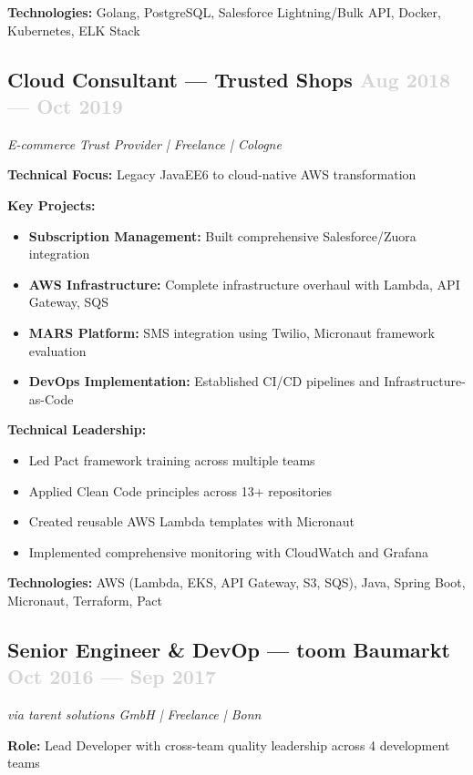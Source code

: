 \documentclass[11pt,a4paper]{article}
\begin{document}
\textbf{Technologies:} Golang, PostgreSQL, Salesforce Lightning/Bulk API, Docker, Kubernetes, ELK Stack

\newpage

\subsection{Cloud Consultant — Trusted Shops \hfill \textcolor{lightgray}{Aug 2018 — Oct 2019}}
\textsl{E-commerce Trust Provider | Freelance | Cologne}

\textbf{Technical Focus:} Legacy JavaEE6 to cloud-native AWS transformation

\textbf{Key Projects:}
\begin{itemize}
    \item \textbf{Subscription Management:} Built comprehensive Salesforce/Zuora integration
    \item \textbf{AWS Infrastructure:} Complete infrastructure overhaul with Lambda, API Gateway, SQS
    \item \textbf{MARS Platform:} SMS integration using Twilio, Micronaut framework evaluation
    \item \textbf{DevOps Implementation:} Established CI/CD pipelines and Infrastructure-as-Code
\end{itemize}

\textbf{Technical Leadership:}
\begin{itemize}
    \item Led Pact framework training across multiple teams
    \item Applied Clean Code principles across 13+ repositories
    \item Created reusable AWS Lambda templates with Micronaut
    \item Implemented comprehensive monitoring with CloudWatch and Grafana
\end{itemize}

\textbf{Technologies:} AWS (Lambda, EKS, API Gateway, S3, SQS), Java, Spring Boot, Micronaut, Terraform, Pact

\subsection{Senior Engineer \& DevOp — toom Baumarkt \hfill \textcolor{lightgray}{Oct 2016 — Sep 2017}}
\textsl{via tarent solutions GmbH | Freelance | Bonn}

\textbf{Role:} Lead Developer with cross-team quality leadership across 4 development teams
\end{document}
